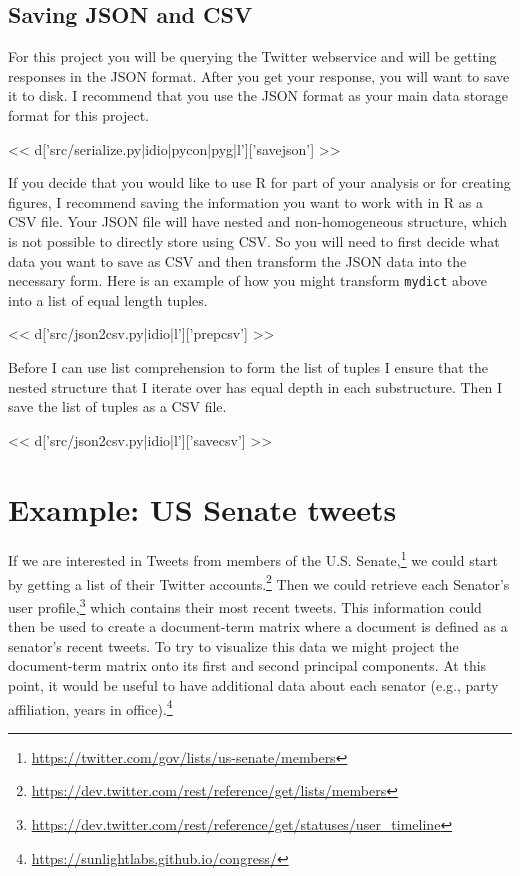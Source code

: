 \subsection*{Saving JSON and CSV}
For this project you will be querying the Twitter webservice and will
be getting responses in the JSON format.  After you get your response,
you will want to save it to disk.  I recommend that you use the JSON
format as your main data storage format for this project.

<< d['src/serialize.py|idio|pycon|pyg|l']['savejson'] >>

If you decide that you would like to use R for part of your analysis or for
creating figures, I recommend saving the information you want to work with in R
as a CSV file.  Your JSON file will have nested and non-homogeneous structure,
which is not possible to directly store using CSV.  So you will need to first
decide what data you want to save as CSV and then transform the JSON data into
the necessary form.  Here is an example of how you might transform
\texttt{mydict} above into a list of equal length tuples.

<< d['src/json2csv.py|idio|l']['prepcsv'] >>

Before I can use list comprehension to form the list of tuples I ensure that
the nested structure that I iterate over has equal depth in each substructure.
Then I save the list of tuples as a CSV file.

<< d['src/json2csv.py|idio|l']['savecsv'] >>


\section{Example: US Senate tweets}

If we are interested in Tweets from members of the U.S.
Senate,\footnote{\url{https://twitter.com/gov/lists/us-senate/members}} we
could start by getting a list of their Twitter
accounts.\footnote{\url{https://dev.twitter.com/rest/reference/get/lists/members}}
Then we could retrieve each Senator's user
profile,\footnote{\url{https://dev.twitter.com/rest/reference/get/statuses/user_timeline}}
which contains their most recent tweets.  This information could then be used
to create a document-term matrix where a document is defined as a senator's
recent tweets.  To try to visualize this data we might project the
document-term matrix onto its first and second principal components.  At this
point, it would be useful to have additional data about each senator (e.g.,
party affiliation, years in
office).\footnote{\url{https://sunlightlabs.github.io/congress/}}


